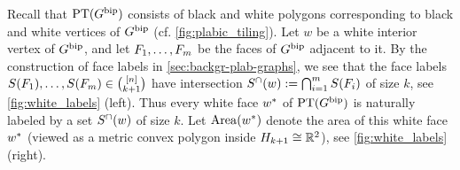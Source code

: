 \documentclass[11pt]{amsart}
\theoremstyle{plain}
\theoremstyle{definition}
\def\R{\mathbb{R}}
\def\PT{\operatorname{PT}}
\begin{document}
Recall that $\PT(\Gbip)$ consists of black and white polygons corresponding to black and white vertices of $G^{{\operatorname{bip}}}$ (cf. \cref{fig:plabic_tiling}). Let $w$ be a white interior vertex of $G^{{\operatorname{bip}}}$, and let $F_1,\dots,F_m$ be the faces of $G^{{\operatorname{bip}}}$ adjacent to it. By the construction of face labels in \cref{sec:backgr-plab-graphs}, we see that the face labels $S(F_1),\dots,S(F_m)\in{[n]\choose k+1}$ have intersection $S^\cap(w):=\bigcap_{i=1}^m S(F_i)$ of size $k$, see 
\cref{fig:white_labels} (left).
Thus every white face 
$w^\ast$ of 
$\PT(\Gbip)$ is naturally labeled by a set $S^\cap(w)$ of size $k$. Let  $\operatorname{Area}(w^\ast)$ denote 
the area of this white face $w^\ast$ (viewed as a metric convex polygon inside $\Hyp_{k+1}\cong \R^2$), 
see \cref{fig:white_labels} (right).
\end{document}
